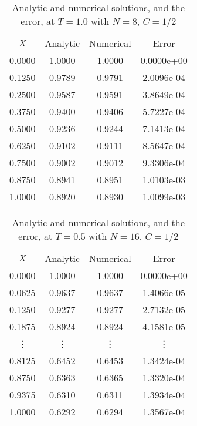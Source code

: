 \documentclass[12pt]{extarticle}
\begin{document}
\begin{table}[htp!]
\caption{Analytic and numerical solutions, and the error, at $T=1.0$ with $N=8$, $C=1/2$}
\centering
\begin{tabular}{cccc}
\\
$X$ & Analytic & Numerical & Error \\ [0.5ex]
0.0000 & 1.0000 & 1.0000 & 0.0000e+00 \\ 
0.1250 & 0.9789 & 0.9791 & 2.0096e-04 \\ 
0.2500 & 0.9587 & 0.9591 & 3.8649e-04 \\ 
0.3750 & 0.9400 & 0.9406 & 5.7227e-04 \\ 
0.5000 & 0.9236 & 0.9244 & 7.1413e-04 \\ 
0.6250 & 0.9102 & 0.9111 & 8.5647e-04 \\ 
0.7500 & 0.9002 & 0.9012 & 9.3306e-04 \\ 
0.8750 & 0.8941 & 0.8951 & 1.0103e-03 \\ 
1.0000 & 0.8920 & 0.8930 & 1.0099e-03 \\ 
\end{tabular}
\label{table:5}
\end{table}

\begin{table}[htp!]
\caption{Analytic and numerical solutions, and the error, at $T=0.5$ with $N=16$, $C=1/2$ }
\centering
\begin{tabular}{cccc}
\\
$X$ & Analytic & Numerical & Error \\ [0.5ex]
0.0000 & 1.0000 & 1.0000 & 0.0000e+00 \\ 
0.0625 & 0.9637 & 0.9637 & 1.4066e-05 \\ 
0.1250 & 0.9277 & 0.9277 & 2.7132e-05 \\ 
0.1875 & 0.8924 & 0.8924 & 4.1581e-05 \\ 
\vdots & \vdots & \vdots & \vdots\\
0.8125 & 0.6452 & 0.6453 & 1.3424e-04 \\ 
0.8750 & 0.6363 & 0.6365 & 1.3320e-04 \\ 
0.9375 & 0.6310 & 0.6311 & 1.3934e-04 \\ 
1.0000 & 0.6292 & 0.6294 & 1.3567e-04 \\ 
\end{tabular}
\label{table:6}
\end{table}
\end{document}

